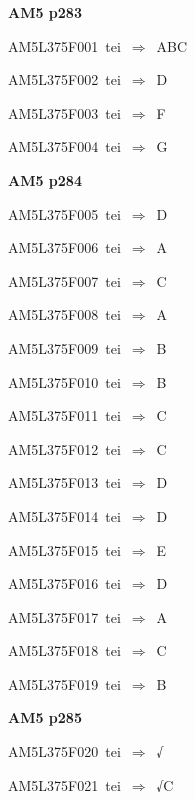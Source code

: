 \par\vfill\eject
{\bf\hfill AM5 p283\hfill\hbox{}}\par\bigskip
{\sixrm AM5L375F001\ {\sixit tei}\ }$\Rightarrow$\ ABC\par\smallskip
{\sixrm AM5L375F002\ {\sixit tei}\ }$\Rightarrow$\ D\par\smallskip
{\sixrm AM5L375F003\ {\sixit tei}\ }$\Rightarrow$\ F\par\smallskip
{\sixrm AM5L375F004\ {\sixit tei}\ }$\Rightarrow$\ G\par\smallskip

\par\vfill\eject
{\bf\hfill AM5 p284\hfill\hbox{}}\par\bigskip
{\sixrm AM5L375F005\ {\sixit tei}\ }$\Rightarrow$\ D\par\smallskip
{\sixrm AM5L375F006\ {\sixit tei}\ }$\Rightarrow$\ A\par\smallskip
{\sixrm AM5L375F007\ {\sixit tei}\ }$\Rightarrow$\ C\par\smallskip
{\sixrm AM5L375F008\ {\sixit tei}\ }$\Rightarrow$\ A\par\smallskip
{\sixrm AM5L375F009\ {\sixit tei}\ }$\Rightarrow$\ B\par\smallskip
{\sixrm AM5L375F010\ {\sixit tei}\ }$\Rightarrow$\ B\par\smallskip
{\sixrm AM5L375F011\ {\sixit tei}\ }$\Rightarrow$\ C\par\smallskip
{\sixrm AM5L375F012\ {\sixit tei}\ }$\Rightarrow$\ C\par\smallskip
{\sixrm AM5L375F013\ {\sixit tei}\ }$\Rightarrow$\ D\par\smallskip
{\sixrm AM5L375F014\ {\sixit tei}\ }$\Rightarrow$\ D\par\smallskip
{\sixrm AM5L375F015\ {\sixit tei}\ }$\Rightarrow$\ E\par\smallskip
{\sixrm AM5L375F016\ {\sixit tei}\ }$\Rightarrow$\ D\par\smallskip
{\sixrm AM5L375F017\ {\sixit tei}\ }$\Rightarrow$\ A\par\smallskip
{\sixrm AM5L375F018\ {\sixit tei}\ }$\Rightarrow$\ C\par\smallskip
{\sixrm AM5L375F019\ {\sixit tei}\ }$\Rightarrow$\ B\par\smallskip

\par\vfill\eject
{\bf\hfill AM5 p285\hfill\hbox{}}\par\bigskip
{\sixrm AM5L375F020\ {\sixit tei}\ }$\Rightarrow$\ √\par\smallskip
{\sixrm AM5L375F021\ {\sixit tei}\ }$\Rightarrow$\ √C\par\smallskip

